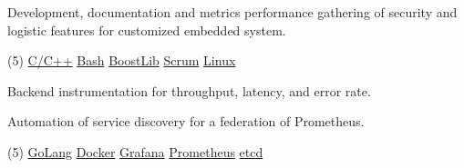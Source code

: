 \documentclass[10pt,a4paper]{altacv}
\begin{document}
{\smallskip\justifying
{\color{description}
Development, documentation and metrics performance gathering of security and logistic features for customized embedded system.
\par}
\smallskip


\vspace{-0.5mm}
\begin{tasks}[label-offset=0.5mm, item-indent=5.0mm, label-align=left, label={\scriptsize\faCode}, label-format={\scriptsize\color{tech}}, item-format={\bfseries\footnotesize\color{emphasis}}](5)
	\task \href{https://www.cplusplus.com/}{C/C++}
	\task \href{https://www.gnu.org/software/bash/}{Bash}
	\task \href{https://www.boost.org/}{BoostLib}
	\task \href{http://www.scrummanifesto.org/}{Scrum}
	\task \href{https://www.archlinux.org/}{Linux}
\end{tasks}

\divider


{\smallskip\justifying
{\color{description}Backend instrumentation for throughput, latency, and error rate.}
\par}
\smallskip

{\smallskip\justifying
{\color{description}Automation of service discovery for a federation of Prometheus.}
\par}

\vspace{-0.5mm}
\begin{tasks}[label-offset=0.5mm, item-indent=5.0mm, label-align=left, label={\scriptsize\faCode}, label-format={\scriptsize\color{tech}}, item-format={\bfseries\footnotesize\color{emphasis}}](5)
	\task \href{https://golang.org/}{GoLang}
	\task \href{https://www.docker.com/}{Docker}
	\task \href{https://grafana.com/}{Grafana}
	\task \href{https://prometheus.io/}{Prometheus}
	\task \href{https://etcd.io/}{etcd}
\end{tasks}

\divider



}
\end{document}
